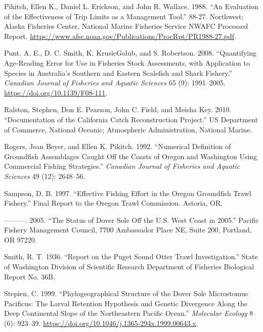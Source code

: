 \documentclass[11pt,
  english,
  a4paper,
]{article}
\begin{document}
\begin{cslreferences}
\leavevmode\hypertarget{ref-pikitch_evaluation_1988}{}%
Pikitch, Ellen K., Daniel L. Erickson, and John R. Wallace. 1988. ``An Evaluation of the Effectiveness of Trip Limits as a Management Tool.'' 88-27. Northwest; Alaska Fisheries Center, National Marine Fisheries Service NWAFC Processed Report. \url{https://www.afsc.noaa.gov/Publications/ProcRpt/PR1988-27.pdf}.

\leavevmode\hypertarget{ref-punt_quantifying_2008}{}%
Punt, A. E., D. C. Smith, K. KrusicGolub, and S. Robertson. 2008. ``Quantifying Age-Reading Error for Use in Fisheries Stock Assessments, with Application to Species in Australia's Southern and Eastern Scalefish and Shark Fishery.'' \emph{Canadian Journal of Fisheries and Aquatic Sciences} 65 (9): 1991--2005. \url{https://doi.org/10.1139/F08-111}.

\leavevmode\hypertarget{ref-ralston_documentation_2010}{}%
Ralston, Stephen, Don E. Pearson, John C. Field, and Meisha Key. 2010. ``Documentation of the California Catch Reconstruction Project.'' US Department of Commerce, National Oceanic; Atmospheric Administration, National Marine.

\leavevmode\hypertarget{ref-rogers_numerical_1992}{}%
Rogers, Jean Beyer, and Ellen K. Pikitch. 1992. ``Numerical Definition of Groundfish Assemblages Caught Off the Coasts of Oregon and Washington Using Commercial Fishing Strategies.'' \emph{Canadian Journal of Fisheries and Aquatic Sciences} 49 (12): 2648--56.

\leavevmode\hypertarget{ref-sampson_effective_1997}{}%
Sampson, D. B. 1997. ``Effective Fishing Effort in the Oregon Groundfish Trawl Fishery.'' Final Report to the Oregon Trawl Commission. Astoria, OR.

\leavevmode\hypertarget{ref-sampson_status_2005}{}%
---------. 2005. ``The Status of Dover Sole Off the U.S. West Coast in 2005.'' Pacific Fishery Management Council, 7700 Ambassador Place NE, Suite 200, Portland, OR 97220.

\leavevmode\hypertarget{ref-smith_report_1936}{}%
Smith, R. T. 1936. ``Report on the Puget Sound Otter Trawl Investigation.'' State of Washington Division of Scientific Research Department of Fisheries Biological Report No. 36B.

\leavevmode\hypertarget{ref-stepien_phylogeographical_1999}{}%
Stepien, C. 1999. ``Phylogeographical Structure of the Dover Sole Microstomus Pacificus: The Larval Retention Hypothesis and Genetic Divergence Along the Deep Continental Slope of the Northeastern Pacific Ocean.'' \emph{Molecular Ecology} 8 (6): 923--39. \url{https://doi.org/10.1046/j.1365-294x.1999.00643.x}.


\end{cslreferences}
\end{document}
